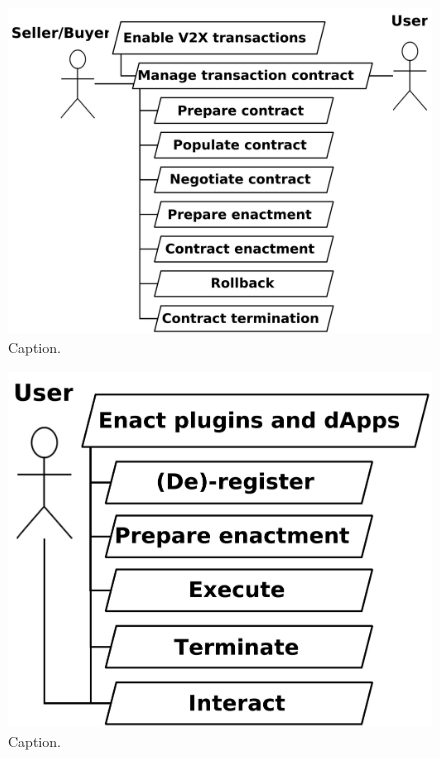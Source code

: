 \documentclass{llncs}
\begin{document}
{				\begin{figure}[H]
					\centering
					\includegraphics[scale=0.175]{Figures/aom/20180501_goal-model--refined-3.pdf}
					\caption{Caption.}	
					\label{fig:refined-aom-goal-model-3}
				\end{figure}
				
				\begin{figure}[H]
					\centering
					\includegraphics[scale=0.175]{Figures/aom/20180501_goal-model--refined-4.pdf}
					\caption{Caption.}	
					\label{fig:refined-aom-goal-model-4}
				\end{figure}
									
}
\end{document}
